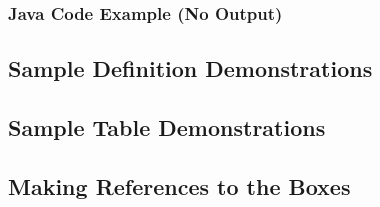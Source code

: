 \subsubsection{Java Code Example (No Output)}

\subsection{Sample Definition Demonstrations}
\subsection{Sample Table Demonstrations}


\subsection{Making References to the Boxes}